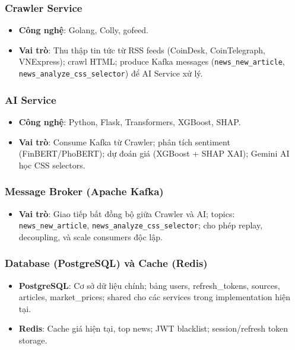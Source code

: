 \subsubsection{Crawler Service}

\begin{itemize}
    \item \textbf{Công nghệ}: Golang, Colly, gofeed.
    \item \textbf{Vai trò}: Thu thập tin tức từ RSS feeds (CoinDesk, CoinTelegraph, VNExpress); crawl HTML; produce Kafka messages (\texttt{news\_new\_article}, \texttt{news\_analyze\_css\_selector}) để AI Service xử lý.
\end{itemize}

\subsubsection{AI Service}

\begin{itemize}
    \item \textbf{Công nghệ}: Python, Flask, Transformers, XGBoost, SHAP.
    \item \textbf{Vai trò}: Consume Kafka từ Crawler; phân tích sentiment (FinBERT/PhoBERT); dự đoán giá (XGBoost + SHAP XAI); Gemini AI học CSS selectors.
\end{itemize}

\subsubsection{Message Broker (Apache Kafka)}

\begin{itemize}
    \item \textbf{Vai trò}: Giao tiếp bất đồng bộ giữa Crawler và AI; topics: \texttt{news\_new\_article}, \texttt{news\_analyze\_css\_selector}; cho phép replay, decoupling, và scale consumers độc lập.
\end{itemize}

\subsubsection{Database (PostgreSQL) và Cache (Redis)}

\begin{itemize}
    \item \textbf{PostgreSQL}: Cơ sở dữ liệu chính; bảng users, refresh\_tokens, sources, articles, market\_prices; shared cho các services trong implementation hiện tại.
    \item \textbf{Redis}: Cache giá hiện tại, top news; JWT blacklist; session/refresh token storage.
\end{itemize}

